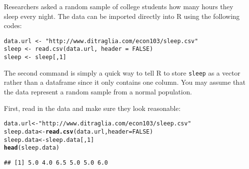 \documentclass[addpoints,12pt]{exam}\usepackage[]{graphicx}\usepackage[]{color}
\makeatletter
\newcommand{\hlnum}[1]{\textcolor[rgb]{0.686,0.059,0.569}{#1}}%
\newcommand{\hlstr}[1]{\textcolor[rgb]{0.192,0.494,0.8}{#1}}%
\newcommand{\hlstd}[1]{\textcolor[rgb]{0.345,0.345,0.345}{#1}}%
\newcommand{\hlkwb}[1]{\textcolor[rgb]{0.69,0.353,0.396}{#1}}%
\newcommand{\hlkwc}[1]{\textcolor[rgb]{0.333,0.667,0.333}{#1}}%
\newcommand{\hlkwd}[1]{\textcolor[rgb]{0.737,0.353,0.396}{\textbf{#1}}}%
\newenvironment{kframe}{%
 \def\at@end@of@kframe{}%
 \ifinner\ifhmode%
  \def\at@end@of@kframe{\end{minipage}}%
  \begin{minipage}{\columnwidth}%
 \fi\fi%
 \def\FrameCommand##1{\hskip\@totalleftmargin \hskip-\fboxsep
 \colorbox{shadecolor}{##1}\hskip-\fboxsep
     \hskip-\linewidth \hskip-\@totalleftmargin \hskip\columnwidth}%
 \MakeFramed {\advance\hsize-\width
   \@totalleftmargin\z@ \linewidth\hsize
   \@setminipage}}%
 {\par\unskip\endMakeFramed%
 \at@end@of@kframe}
\newenvironment{knitrout}{}{} %
\makeatother
\begin{document}
\begin{questions}
	





\question Researchers asked a random sample of college students how many hours they sleep every night. The data can be imported directly into R using the following codes:
\begin{verbatim}
data.url <- "http://www.ditraglia.com/econ103/sleep.csv"
sleep <- read.csv(data.url, header = FALSE)
sleep <- sleep[,1]
\end{verbatim}
The second command is simply a quick way to tell R to store \texttt{sleep} as a vector rather than a dataframe since it only contains one column. You may assume that the data represent a random sample from a normal population.
  \begin{solution}
  First, read in the data and make sure they look reasonable:
\begin{knitrout}
\color{fgcolor}\begin{kframe}
\begin{alltt}
\hlstd{data.url} \hlkwb{<-} \hlstr{"http://www.ditraglia.com/econ103/sleep.csv"}
\hlstd{sleep.data} \hlkwb{<-} \hlkwd{read.csv}\hlstd{(data.url,} \hlkwc{header} \hlstd{=} \hlnum{FALSE}\hlstd{)}
\hlstd{sleep.data} \hlkwb{<-} \hlstd{sleep.data[,}\hlnum{1}\hlstd{]}
\hlkwd{head}\hlstd{(sleep.data)}
\end{alltt}
\begin{verbatim}
## [1] 5.0 4.0 6.5 5.0 5.0 6.0
\end{verbatim}
\end{kframe}
\end{knitrout}
  \end{solution}
\begin{parts}

\end{parts}
\end{questions}
\end{document}
